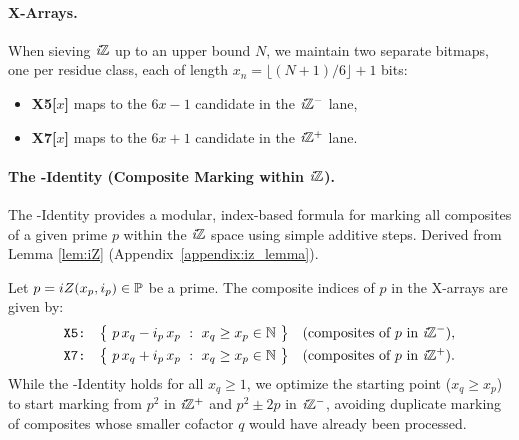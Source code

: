 \documentclass{article}
\begin{document}
\paragraph{X-Arrays.}
When sieving $\textit{i}\mathbb{Z}$ up to an upper bound $N$, we maintain two separate bitmaps, one per residue class, each of length $x_n = \lfloor (N+1)/6 \rfloor + 1$ bits:
\begin{itemize}[noitemsep]
    \item \textbf{X5[$x$]} maps to the $6x-1$ candidate in the $\textit{i}\mathbb{Z}^-$ lane,
    \item \textbf{X7[$x$]} maps to the $6x+1$ candidate in the $\textit{i}\mathbb{Z}^+$ lane.
\end{itemize}

\paragraph{The \Xp-Identity (Composite Marking within $\textit{i}\mathbb{Z}$).} \label{sec:xp_id}
The \Xp-Identity provides a modular, index-based formula for marking all composites of a given prime $p$ within the $\textit{i}\mathbb{Z}$ space using simple additive steps. Derived from Lemma \ref{lem:iZ} (Appendix~\ref{appendix:iz_lemma}).
\begin{definition}[\Xp-Identity]
    Let $p=iZ(x_p,i_p)\in\mathbb{P}$ be a prime. The composite indices of $p$ in the X-arrays are given by:
    \[
    \begin{aligned}
        \texttt{X5:}&\quad \big\{\ p\,x_q - i_p\,x_p\ :\ x_q\ge x_p \in\mathbb{N}\ \big\} \quad\text{(composites of $p$ in $\textit{i}\mathbb{Z}^-$)},\\
        \texttt{X7:}&\quad \big\{\ p\,x_q + i_p\,x_p\ :\ x_q\ge x_p \in\mathbb{N}\ \big\} \quad\text{(composites of $p$ in $\textit{i}\mathbb{Z}^+$)}.
    \end{aligned}
    \]
    While the \Xp-Identity holds for all $x_q \ge 1$, we optimize the starting point ($x_q \ge x_p$) to start marking from $p^2$ in $\textit{i}\mathbb{Z}^+$ and $p^2 \pm 2p$ in $\textit{i}\mathbb{Z}^-$, avoiding duplicate marking of composites whose smaller cofactor $q$ would have already been processed.
\end{definition}
\end{document}
